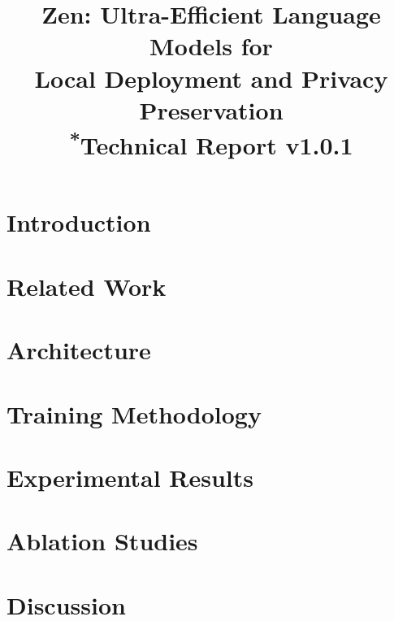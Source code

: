 \documentclass[conference]{IEEEtran}
\begin{document}
\title{Zen: Ultra-Efficient Language Models for\\Local Deployment and Privacy Preservation\\
{\footnotesize \textsuperscript{*}Technical Report v1.0.1}
}

\author{
}

\maketitle



\section{Introduction}


\section{Related Work}


\section{Architecture}


\section{Training Methodology}


\section{Experimental Results}


\section{Ablation Studies}


\section{Discussion}

\end{document}

